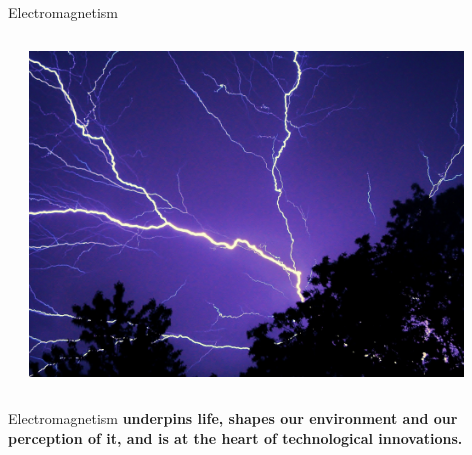 \begin{frame}{Electromagnetism}
\begin{columns}
\begin{column}{0.33\textwidth}
      \end{column}
      \begin{column}{0.33\textwidth}
        \begin{center}
          \includegraphics[width=0.90\textwidth]{./images/misc/lightning_1.jpg}\\
        \end{center}
      \end{column}
\end{columns}


\begin{center}
{\large
Electromagnetism {\bf underpins life, shapes our environment and our perception of it,
and is at the heart of technological innovations.}\\
}
\end{center}


\end{frame}
